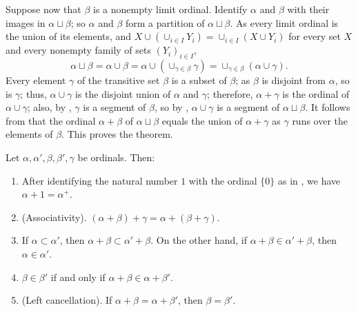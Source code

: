 \documentclass{article}
\begin{document}
Suppose now that \(\beta\) is a nonempty limit ordinal.  Identify
\(\alpha\) and \(\beta\) with their images in \(\alpha \sqcup \beta\);
so \(\alpha\) and \(\beta\) form a partition of
\(\alpha \sqcup \beta\).  As every limit ordinal is the union of its
elements, and
\(X \cup (\cup_{i \in I} Y_i) = \cup_{i \in I} (X \cup Y_i)\) for
every set \(X\) and every nonempty family of sets \((Y_i)_{i \in I}\),
\begin{displaymath}
  \alpha \sqcup \beta = \alpha \cup \beta =
  \alpha \cup (\cup_{\gamma \in \beta} \gamma) =
  \cup_{\gamma \in \beta} (\alpha \cup \gamma).
\end{displaymath}
Every element \(\gamma\) of the transitive set \(\beta\) is a subset
of \(\beta\); as \(\beta\) is disjoint from \(\alpha\), so is
\(\gamma\); thus, \(\alpha \cup \gamma\) is the disjoint union of
\(\alpha\) and \(\gamma\); therefore, \(\alpha + \gamma\) is the
ordinal of \(\alpha \cup \gamma\); also, by ,
\(\gamma\) is a segment of \(\beta\), so by ,
\(\alpha \cup \gamma\) is a segment of \(\alpha \sqcup \beta\).  It
follows from  that the ordinal \(\alpha + \beta\)
of \(\alpha \sqcup \beta\) equals the union of \(\alpha + \gamma\) as
\(\gamma\) runs over the elements of \(\beta\).  This proves the
theorem.

\begin{theorem}
  \label{thm:506mms8z}
  Let \(\alpha, \alpha', \beta, \beta', \gamma\) be ordinals.  Then:
  \begin{enumerate}
  \item After identifying the natural number \(1\) with the ordinal
    \(\{0\}\) as in , we have
    \(\alpha + 1 = \alpha^+\).
  \item (Associativity).
    \((\alpha + \beta) + \gamma = \alpha + (\beta + \gamma)\).
  \item \label{item:n6u00qz2} If \(\alpha \subset \alpha'\), then
    \(\alpha + \beta \subset \alpha' + \beta\).  On the other hand, if
    \(\alpha + \beta \in \alpha' + \beta\), then
    \(\alpha \in \alpha'\).
  \item \label{item:bhc8ls0b} \(\beta \in \beta'\) if and only if
    \(\alpha + \beta \in \alpha + \beta'\).
  \item (Left cancellation).  If
    \(\alpha + \beta = \alpha + \beta'\), then \(\beta = \beta'\).
  \end{enumerate}
\end{theorem}
\end{document}
